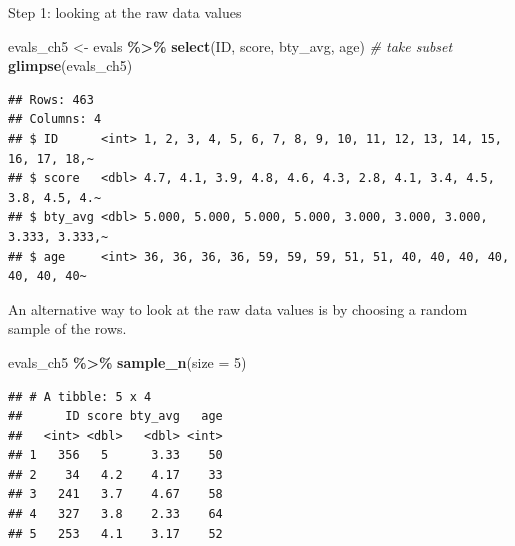 \documentclass[
  ignorenonframetext,
]{beamer}
\newenvironment{Shaded}{\begin{snugshade}}{\end{snugshade}}
\newcommand{\AttributeTok}[1]{\textcolor[rgb]{0.13,0.29,0.53}{#1}}
\newcommand{\CommentTok}[1]{\textcolor[rgb]{0.56,0.35,0.01}{\textit{#1}}}
\newcommand{\DecValTok}[1]{\textcolor[rgb]{0.00,0.00,0.81}{#1}}
\newcommand{\FunctionTok}[1]{\textcolor[rgb]{0.13,0.29,0.53}{\textbf{#1}}}
\newcommand{\NormalTok}[1]{#1}
\newcommand{\OtherTok}[1]{\textcolor[rgb]{0.56,0.35,0.01}{#1}}
\newcommand{\SpecialCharTok}[1]{\textcolor[rgb]{0.81,0.36,0.00}{\textbf{#1}}}
\begin{document}
\begin{frame}[fragile]{Step 1: looking at the raw data values}
\protect\hypertarget{step-1-looking-at-the-raw-data-values}{}
\tiny

\begin{Shaded}
\begin{Highlighting}[]
\NormalTok{evals\_ch5 }\OtherTok{\textless{}{-}}\NormalTok{ evals }\SpecialCharTok{\%\textgreater{}\%}
  \FunctionTok{select}\NormalTok{(ID, score, bty\_avg, age)   }\CommentTok{\# take subset}
\FunctionTok{glimpse}\NormalTok{(evals\_ch5)}
\end{Highlighting}
\end{Shaded}

\begin{verbatim}
## Rows: 463
## Columns: 4
## $ ID      <int> 1, 2, 3, 4, 5, 6, 7, 8, 9, 10, 11, 12, 13, 14, 15, 16, 17, 18,~
## $ score   <dbl> 4.7, 4.1, 3.9, 4.8, 4.6, 4.3, 2.8, 4.1, 3.4, 4.5, 3.8, 4.5, 4.~
## $ bty_avg <dbl> 5.000, 5.000, 5.000, 5.000, 3.000, 3.000, 3.000, 3.333, 3.333,~
## $ age     <int> 36, 36, 36, 36, 59, 59, 59, 51, 51, 40, 40, 40, 40, 40, 40, 40~
\end{verbatim}

\normalsize

An alternative way to look at the raw data values is by choosing a
random sample of the rows.

\tiny

\begin{Shaded}
\begin{Highlighting}[]
\NormalTok{evals\_ch5 }\SpecialCharTok{\%\textgreater{}\%}
  \FunctionTok{sample\_n}\NormalTok{(}\AttributeTok{size =} \DecValTok{5}\NormalTok{)}
\end{Highlighting}
\end{Shaded}

\begin{verbatim}
## # A tibble: 5 x 4
##      ID score bty_avg   age
##   <int> <dbl>   <dbl> <int>
## 1   356   5      3.33    50
## 2    34   4.2    4.17    33
## 3   241   3.7    4.67    58
## 4   327   3.8    2.33    64
## 5   253   4.1    3.17    52
\end{verbatim}

\normalsize
\end{frame}
\end{document}
